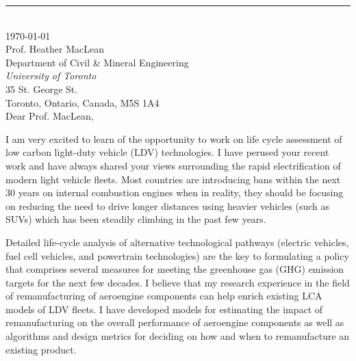 \documentclass[12pt]{article} %
\begin{document}
\medskip %
\rule[0pt]{\textwidth}{1pt}\\
\today\\[6pt]
Prof. Heather MacLean\\
Department of Civil \& Mineral Engineering\\
\textit{University of Toronto}\\
35 St. George St.\\
Toronto, Ontario, Canada, M5S 1A4\\[6pt] \medskip
Dear Prof. MacLean,


\medskip %
I am very excited to learn of the opportunity to work on life cycle assessment of low carbon light-duty vehicle (LDV) technologies. I have perused your recent work and have always shared your views surrounding the rapid electrification of modern light vehicle fleets. Most countries are introducing bans within the next 30 years on internal combustion engines when in reality, they should be focusing on reducing the need to drive longer distances using heavier vehicles (such as SUVs) which has been steadily climbing in the past few years.

\medskip %

Detailed life-cycle analysis of alternative technological pathways (electric vehicles, fuel cell vehicles, and powertrain technologies) are the key to formulating a policy that comprises several measures for meeting the greenhouse gas (GHG) emission targets for the next few decades. I believe that my research experience in the field of remanufacturing of aeroengine components can help enrich existing LCA models of LDV fleets. I have developed models for estimating the impact of remanufacturing on the overall performance of aeroengine components as well as algorithms and design metrics for deciding on how and when to remanufacture an existing product.
\end{document}
